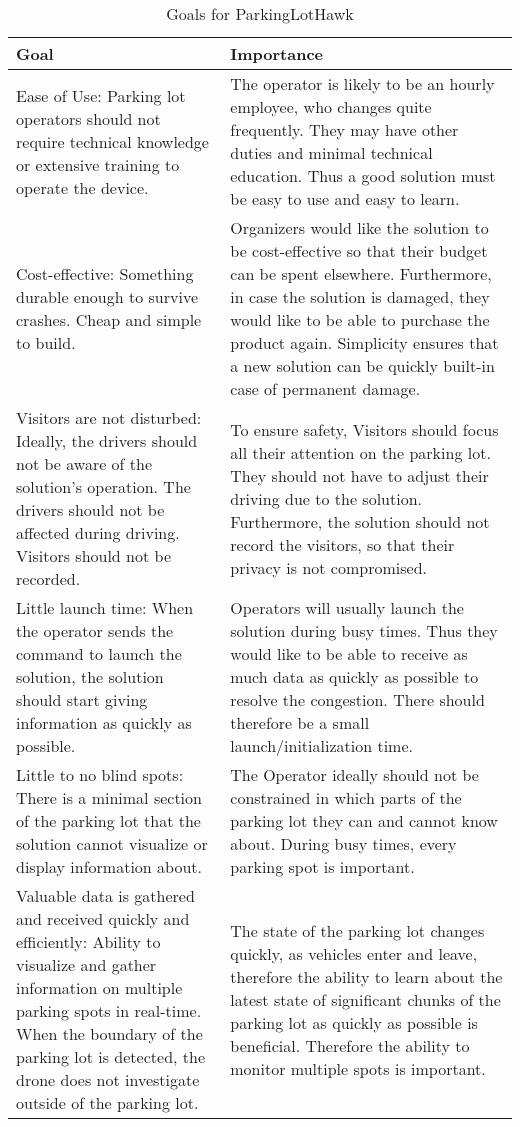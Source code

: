 \documentclass{article}
\begin{document}
\begin{table}
\centering
\caption {Goals for ParkingLotHawk} 
\label{table:Goals}
\begin{tabular}{ | m{5cm} | m{7cm} | } 

  \hline
  Goal & Importance \\ 
  \hline
  Ease of Use: Parking lot operators should not require technical knowledge or extensive training to operate the device.
& The operator is likely to be an hourly employee, who changes quite frequently. They may have other duties and minimal technical education. Thus a good solution must be easy to use and easy to learn. 
  \\ 
  \hline
  Cost-effective: Something durable enough to survive crashes. Cheap and simple to build.
 & Organizers would like the solution to be cost-effective so that their budget can be spent elsewhere. Furthermore, in case the solution is damaged, they would like to be able to purchase the product again. Simplicity ensures that a new solution can be quickly built-in case of permanent damage. 
 \\ 
  \hline
  Visitors are not disturbed: Ideally, the drivers should not be aware of the solution's operation. The drivers should not be affected during driving. Visitors should not be recorded. 
 & To ensure safety, Visitors should focus all their attention on the parking lot. They should not have to adjust their driving due to the solution. Furthermore, the solution should not record the visitors, so that their privacy is not compromised.
 \\ 
  \hline
  Little launch time: When the operator sends the command to launch the solution, the solution should start giving information as quickly as possible. 
 & Operators will usually launch the solution during busy times. Thus they would like to be able to receive as much data as quickly as possible to resolve the congestion. There should therefore be a small launch/initialization time.
 \\ 
  \hline
  Little to no blind spots: There is a minimal section of the parking lot that the solution cannot visualize or display information about.
 & The Operator ideally should not be constrained in which parts of the parking lot they can and cannot know about. During busy times, every parking spot is important.
 \\ 
  \hline
    Valuable data is gathered and received quickly and efficiently: Ability to visualize and gather information on multiple parking spots in real-time. When the boundary of the parking lot is detected, the drone does not investigate outside of the parking lot. 
 & The state of the parking lot changes quickly, as vehicles enter and leave, therefore the ability to learn about the latest state of significant chunks of the parking lot as quickly as possible is beneficial. Therefore the ability to monitor multiple spots is important.


\end{tabular}
\end{table}
\end{document}
